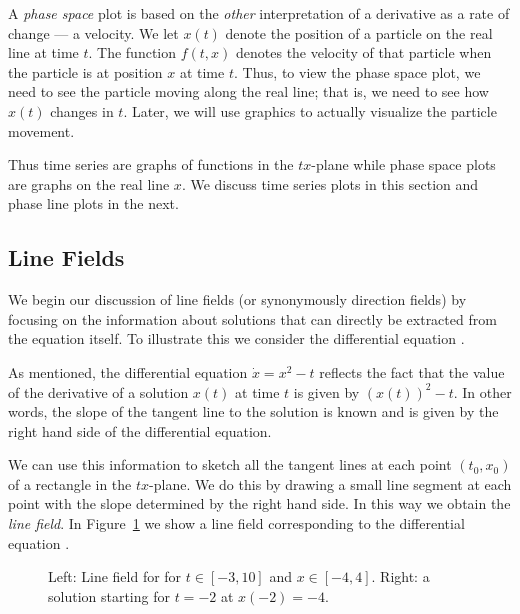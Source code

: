 A {\em phase space\/}  plot is based on
the {\em other\/} interpretation of a derivative as a rate of
change --- a velocity.  We let $x(t)$ denote the position of a
particle on the real line at time $t$.  The function $f(t,x)$
denotes the velocity of that particle when the particle is at
position $x$ at time $t$.  Thus, to view the phase space plot,
we need to see the particle moving along the real line; that is,
we need to see how $x(t)$ changes in $t$.  Later, we will use
\Matlab graphics to actually visualize the particle movement.

Thus time series are graphs of functions in the $tx$-plane while
phase space plots are graphs on the real line $x$.  We discuss
time series plots in this section and phase line plots in the
next.


\subsection*{Line Fields}

We begin our discussion of line fields  (or
synonymously direction fields)  by
focusing on the information about solutions that can directly
be extracted from the equation itself.  To illustrate this we
consider the differential equation .

As mentioned, the differential equation $\dot{x}=x^2-t$ reflects the fact 
that the value of the derivative of a solution $x(t)$ at time $t$ is
given by $(x(t))^2-t$.  In other words, the slope of the tangent
line to the solution is known and is given by the right hand
side of the differential equation.

We can use this information to sketch all the tangent lines at
each point $(t_0,x_0)$ of a rectangle in the $tx$-plane.  We do
this by drawing a small line segment at each point with the
slope determined by the right hand side.  In this way we obtain the
{\em line field}.  In Figure~\ref{df1_labelfig} we show a
line field corresponding to the differential equation .

\begin{figure}[htb]
        \centerline{%
	}
        \caption{Left: Line field for \protect{}
              for $t\in [-3,10]$ and $x\in [-4,4]$.
	      Right: a solution starting for $t=-2$ at $x(-2)=-4$.}
        \label{df1_labelfig}
\end{figure}

